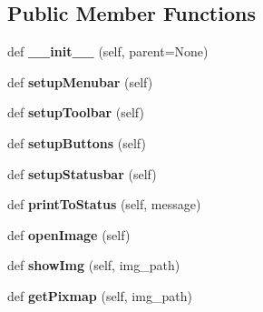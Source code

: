 \subsection*{Public Member Functions}
\begin{DoxyCompactItemize}
\item 
def {\bfseries \+\_\+\+\_\+init\+\_\+\+\_\+} (self, parent=None)\hypertarget{classEnchain_1_1MainWindow_a7f0e08facb3dfa0491954c7ceb5b4b58}{}\label{classEnchain_1_1MainWindow_a7f0e08facb3dfa0491954c7ceb5b4b58}

\item 
def {\bfseries setup\+Menubar} (self)\hypertarget{classEnchain_1_1MainWindow_ab61ba6fe3f0aa7f38186764edcdbbe83}{}\label{classEnchain_1_1MainWindow_ab61ba6fe3f0aa7f38186764edcdbbe83}

\item 
def {\bfseries setup\+Toolbar} (self)\hypertarget{classEnchain_1_1MainWindow_af4f255cd0632e3cb349c4df086958846}{}\label{classEnchain_1_1MainWindow_af4f255cd0632e3cb349c4df086958846}

\item 
def {\bfseries setup\+Buttons} (self)\hypertarget{classEnchain_1_1MainWindow_aaf6eb5f3f030979fcf95a874fe5dac03}{}\label{classEnchain_1_1MainWindow_aaf6eb5f3f030979fcf95a874fe5dac03}

\item 
def {\bfseries setup\+Statusbar} (self)\hypertarget{classEnchain_1_1MainWindow_a6c17e4aed6d8b32d6188fba360710419}{}\label{classEnchain_1_1MainWindow_a6c17e4aed6d8b32d6188fba360710419}

\item 
def {\bfseries print\+To\+Status} (self, message)\hypertarget{classEnchain_1_1MainWindow_ad892d70ac25c1e02b87f5cf324be0108}{}\label{classEnchain_1_1MainWindow_ad892d70ac25c1e02b87f5cf324be0108}

\item 
def {\bfseries open\+Image} (self)\hypertarget{classEnchain_1_1MainWindow_affd03c35f9e579386c3d4e27099bc17d}{}\label{classEnchain_1_1MainWindow_affd03c35f9e579386c3d4e27099bc17d}

\item 
def {\bfseries show\+Img} (self, img\+\_\+path)\hypertarget{classEnchain_1_1MainWindow_acecbe623251e65191209eae62f77693b}{}\label{classEnchain_1_1MainWindow_acecbe623251e65191209eae62f77693b}

\item 
def {\bfseries get\+Pixmap} (self, img\+\_\+path)\hypertarget{classEnchain_1_1MainWindow_a5f3f4302aa4180d5e50f246899f1aaba}{}\label{classEnchain_1_1MainWindow_a5f3f4302aa4180d5e50f246899f1aaba}


\end{DoxyCompactItemize}
